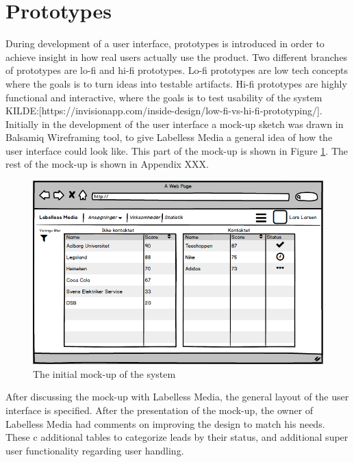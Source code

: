 \section{Prototypes}
During development of a user interface, prototypes is introduced in order to achieve insight in how real users actually use the product. Two different branches of prototypes are lo-fi and hi-fi prototypes.
\newline \newline
\noindent
Lo-fi prototypes are low tech concepts where the goals is to turn ideas into testable artifacts. Hi-fi prototypes are highly functional and interactive, where the goals is to test usability of the system KILDE:[https://invisionapp.com/inside-design/low-fi-vs-hi-fi-prototyping/]. 
\newline \newline
\noindent
Initially in the development of the user interface a mock-up sketch was drawn in Balsamiq Wireframing tool, to give Labelless Media a general idea of how the user interface could look like. This part of the mock-up is shown in Figure \ref{fig:initialMockup}. The rest of the mock-up is shown in Appendix XXX.
\newline
\begin{figure}[H]
    \centering
    \includegraphics[scale=0.7, clip]{figures/initialMockup.png}
    \caption{The initial mock-up of the system}
    \label{fig:initialMockup}
\end{figure}
\noindent
After discussing the mock-up with Labelless Media, the general layout of the user interface is specified. After the presentation of the mock-up, the owner of Labelless Media had comments on improving the design to match his needs. These c additional tables to categorize leads by their status, and additional super user functionality regarding user handling. 







